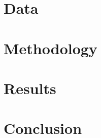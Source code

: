 \documentclass[letterpaper,11pt,leqno]{article}
\begin{document}


\section{Data}\label{sec:data}



\section{Methodology}\label{sec:method}



\section{Results}\label{sec:results}



\section{Conclusion}\label{sec:conc}
\end{document}
